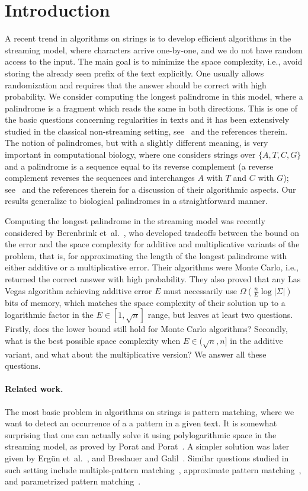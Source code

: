 \documentclass{article}[11pt,letter]
\newcommand{\ie}{i.e.\xspace}
\newcommand{\aerr}{\ensuremath{E}}
\newcommand{\etal}{et~al.}
\begin{document}
\section{Introduction}
A recent trend in algorithms on strings is to develop efficient algorithms in the streaming model, where
characters arrive one-by-one, and we do not have random access to the input. The main goal is to minimize
the space complexity, \ie, avoid storing the already seen prefix of the text explicitly. One usually allows
randomization and requires that the answer should be correct with high probability.
We consider computing the longest palindrome in this model, where a palindrome is a fragment which
reads the same in both directions. This is one of the basic questions concerning regularities in texts
and it has been extensively studied in the classical non-streaming setting, see~\cite{Apostolico,GalilSeiferas,KMP,Manacher}
and the references therein. The notion of palindromes, but with a slightly different meaning, is
very important in
computational biology, where one considers strings over $\{A,T,C,G\}$ and a palindrome is a sequence
equal to its reverse complement (a reverse complement reverses the sequences and interchanges
$A$ with $T$ and $C$ with $G$); see~\cite{GawrychowskiSTACS} and the references therein for
a discussion of their algorithmic aspects. Our results generalize to biological palindromes
in a straightforward manner.

Computing the longest palindrome in the streaming model was recently considered by Berenbrink \etal~\cite{Berenbrink},
who developed tradeoffs between the bound on the error and the space complexity for additive and multiplicative variants of the problem, that is,
for approximating the length of the longest palindrome with either additive or a multiplicative error.
Their algorithms were Monte Carlo, \ie, returned the correct answer with high probability. They also proved
that any Las Vegas algorithm achieving additive error $\aerr$ must necessarily use $\Omega(\frac{n}{\aerr}\log|\Sigma|)$ bits of memory,
which matches the space complexity of their solution up to a logarithmic factor in the $\aerr\in [1,\sqrt{n}]$ range,
but leaves at least two questions. Firstly, does the lower bound still hold for Monte Carlo algorithms? Secondly, 
what is the best possible space complexity when $\aerr\in (\sqrt{n},n]$ in the additive variant,
and what about the multiplicative version? We answer all these questions.


\paragraph{Related work.} The most basic problem in algorithms on strings is pattern matching, where we want to detect an occurrence of a a pattern in a given text.
It is somewhat surprising that one can actually solve it using polylogarithmic space in the streaming model,
as proved by Porat and Porat~\cite{PoratStreaming}. A simpler solution was later given by Erg{\"u}n \etal~\cite{ErgunPeriodicity}, and Breslauer
and Galil~\cite{Breslauer}. Similar questions studied in such setting include multiple-pattern
matching~\cite{DictionaryStream}, approximate pattern matching~\cite{KMismatch}, and
parametrized pattern matching~\cite{ParametrizedStreaming}.
\end{document}
